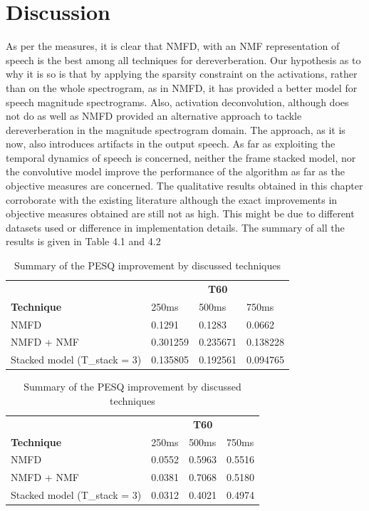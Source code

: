 \documentclass[12pt, a4paper, oneside]{book}
\begin{document}
\section{Discussion}
As per the measures, it is clear that NMFD, with an NMF representation of speech is the best among all techniques for dereverberation. Our hypothesis as to why it is so is that by applying the sparsity constraint on the activations, rather than on the whole spectrogram, as in NMFD, it has provided a better model for speech magnitude spectrograms. Also, activation deconvolution, although does not do as well as NMFD provided an alternative approach to tackle dereverberation in the magnitude spectrogram domain. The approach, as it is now, also introduces artifacts in the output speech. 
As far as exploiting the temporal dynamics of speech is concerned, neither the frame stacked model, nor the convolutive model improve the performance of the algorithm as far as the objective measures are concerned. 
The qualitative results obtained in this chapter corroborate with the existing literature \cite{moham} although the exact improvements in objective measures obtained are still not as high. This might be due to different datasets used or difference in implementation details. The summary of all the results is given in Table 4.1 and 4.2

\begin{table}
\centering
\caption{Summary of the PESQ improvement by discussed techniques}
\label{my-label}
\begin{tabular}{llll}
                             & \multicolumn{3}{c}{\textbf{T60}} \\
\textbf{Technique}           & 250ms     & 500ms     & 750ms    \\
NMFD                         & 0.1291    & 0.1283    & 0.0662   \\
NMFD + NMF                   & 0.301259  & 0.235671  & 0.138228 \\
Stacked model (T\_stack = 3) & 0.135805  & 0.192561  & 0.094765
\end{tabular}
\end{table}

\begin{table}[]
\centering
\caption{Summary of the PESQ improvement by discussed techniques}
\label{my-label}
\begin{tabular}{llll}
                             & \multicolumn{3}{c}{\textbf{T60}} \\
\textbf{Technique}           & 250ms     & 500ms     & 750ms    \\
NMFD                         & 0.0552    & 0.5963    & 0.5516   \\
NMFD + NMF                   & 0.0381    & 0.7068    & 0.5180   \\
Stacked model (T\_stack = 3) & 0.0312    & 0.4021    & 0.4974  
\end{tabular}
\end{table}
\end{document}
